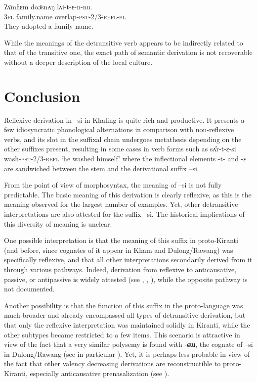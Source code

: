 \documentclass[twoside,a4paper,11pt]{article}
\newcommand{\ipa}[1]{{\phon#1}}
\begin{document}
\begin{exe}
\ex \label{ex:luntsi}
\gll 
\ipa{ʔʌ̄mɦɛm}  	\ipa{doɔ̄snʌŋ}  	\ipa{lʌi-t-ɛ-n-nu.}  \\
\textsc{3pl} family.name overlap-\textsc{pst-2/3-refl-pl} \\
\glt They adopted a family name.
\end{exe}

While the meanings of the detransitive verb appears to be indirectly related to that of the transitive one, the exact path of semantic derivation is not recoverable without a deeper description of the local culture.

\section{Conclusion}
Reflexive derivation in \ipa{--si} in Khaling is quite rich and productive. It  presents a few idiosyncratic phonological alternations in comparison with non-reflexive verbs, and its slot in the suffixal chain undergoes metathesis depending on the other suffixes present,  resulting in some cases in verb forms such as \ipa{sʌ̂r-t-ɛ-si} wash-\textsc{pst-2/3-refl} `he washed himself' where the inflectional elements \ipa{-t-} and \ipa{-ɛ} are sandwiched between the stem and the derivational suffix \ipa{--si}.

From the point of view of morphosyntax, the meaning of  \ipa{--si}  is not fully predictable. The basic meaning of this derivation is clearly reflexive, as this is the meaning observed for the largest number of examples. Yet, other detransitive interpretations are also attested for the suffix \ipa{--si}. The historical implications of this diversity of meaning is unclear. 

One possible interpretation is that the meaning of this suffix in proto-Kiranti (and before, since cognates of it appear in Kham and Dulong/Rawang) was specifically reflexive, and that all other interpretations secondarily  derived from it through various pathways. Indeed, derivation from reflexive to anticausative, passive, or antipassive is widely attested (see \citealt{haspelmath90passive}, \citealt{nedjalkov07reciprocal}, \citealt{say09antipassive}), while the opposite pathway is not documented.


Another possibility is that the function of this suffix in the proto-language was much broader and already encompassed all types of detransitive  derivation, but that only the reflexive interpretation was maintained solidly in Kiranti, while the other subtypes became restricted to a few items. This scenario is attractive in view of the fact that a very similar polysemy is found with \ipa{-ɕɯ}, the cognate of \ipa{--si} in Dulong/Rawang (see in particular \citealt{lapolla05reflexive}). Yet, it is perhaps less probable in view of the fact that other valency decreasing derivations are reconstructible to proto-Kiranti, especially  anticausative prenasalization (see \citealt{jacques13derivational.khaling}). 
\end{document}
